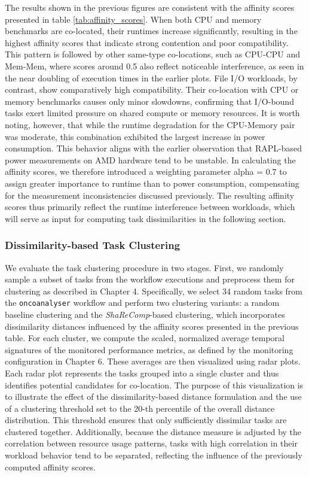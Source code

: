 The results shown in the previous figures are consistent with the affinity scores presented in table \ref{tab:affinity_scores}. When both CPU and memory benchmarks are co-located, their runtimes increase significantly, resulting in the highest affinity scores that indicate strong contention and poor compatibility. This pattern is followed by other same-type co-locations, such as CPU-CPU and Mem-Mem, where scores around 0.5 also reflect noticeable interference, as seen in the near doubling of execution times in the earlier plots. File I/O workloads, by contrast, show comparatively high compatibility. Their co-location with CPU or memory benchmarks causes only minor slowdowns, confirming that I/O-bound tasks exert limited pressure on shared compute or memory resources.
It is worth noting, however, that while the runtime degradation for the CPU-Memory pair was moderate, this combination exhibited the largest increase in power consumption. This behavior aligns with the earlier observation that RAPL-based power measurements on AMD hardware tend to be unstable. In calculating the affinity scores, we therefore introduced a weighting parameter alpha = 0.7 to assign greater importance to runtime than to power consumption, compensating for the measurement inconsistencies discussed previously. The resulting affinity scores thus primarily reflect the runtime interference between workloads, which will serve as input for computing task dissimilarities in the following section.

\subsubsection{Dissimilarity-based Task Clustering}
\label{sec:evaluation_task_consolidation}
We evaluate the task clustering procedure in two stages. First, we randomly sample a subset of tasks from the workflow executions and preprocess them for clustering as described in Chapter 4. Specifically, we select 34 random tasks from the \texttt{oncoanalyser} workflow and perform two clustering variants: a random baseline clustering and the \textit{ShaReComp}-based clustering, which incorporates dissimilarity distances influenced by the affinity scores presented in the previous table.
For each cluster, we compute the scaled, normalized average temporal signatures of the monitored performance metrics, as defined by the monitoring configuration in Chapter 6. These averages are then visualized using radar plots. Each radar plot represents the tasks grouped into a single cluster and thus identifies potential candidates for co-location. The purpose of this visualization is to illustrate the effect of the dissimilarity-based distance formulation and the use of a clustering threshold set to the 20-th percentile of the overall distance distribution. This threshold ensures that only sufficiently dissimilar tasks are clustered together.
Additionally, because the distance measure is adjusted by the correlation between resource usage patterns, tasks with high correlation in their workload behavior tend to be separated, reflecting the influence of the previously computed affinity scores.

